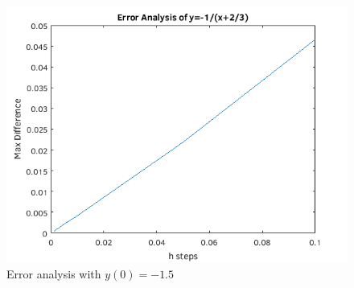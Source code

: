 \documentclass[a4paper,12pt]{article}
\begin{document}
\begin{enumerate}[I.]
\begin{enumerate}[a)]
    \begin{figure}[H]
      \begin{center}
        \includegraphics[scale=.9]{214.png}
        \caption{Error analysis with $y(0) = -1.5$}
      \end{center}
    \end{figure}

  \end{enumerate}
  

\end{enumerate}
\end{document}
